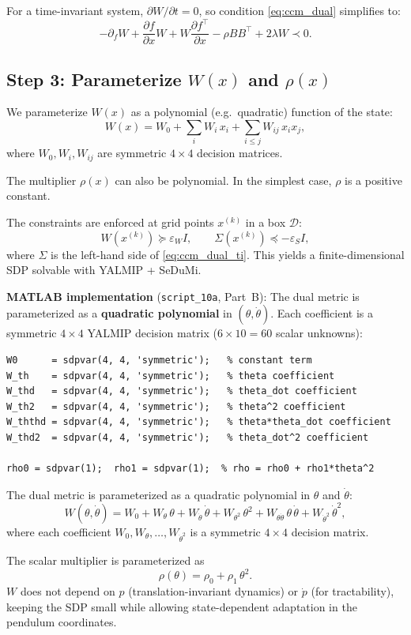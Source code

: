 \documentclass[11pt,a4paper]{article}
\begin{document}
For a time-invariant system, \(\partial W/\partial t = 0\), so condition \eqref{eq:ccm_dual} simplifies to:
\begin{equation}
-\partial_f W + \frac{\partial f}{\partial x}W + W\frac{\partial f^\top}{\partial x} - \rho B B^\top + 2\lambda W \prec 0.
\label{eq:ccm_dual_ti}
\end{equation}

\subsection{Step 3: Parameterize \(W(x)\) and \(\rho(x)\)}

We parameterize \(W(x)\) as a polynomial (e.g.\ quadratic) function of the state:
\[
W(x) = W_0 + \sum_i W_i\, x_i + \sum_{i \le j} W_{ij}\, x_i x_j,
\]
where \(W_0, W_i, W_{ij}\) are symmetric \(4\times 4\) decision matrices.

The multiplier \(\rho(x)\) can also be polynomial. In the simplest case, \(\rho\) is a positive constant.

The constraints are enforced at grid points \(x^{(k)}\) in a box \(\mathcal{D}\):
\[
W(x^{(k)}) \succeq \varepsilon_W I, \qquad
\Sigma(x^{(k)}) \preceq -\varepsilon_S I,
\]
where \(\Sigma\) is the left-hand side of \eqref{eq:ccm_dual_ti}. This yields a finite-dimensional SDP solvable with YALMIP + SeDuMi.

\noindent\textbf{MATLAB implementation} (\texttt{script\_10a}, Part~B): The dual metric is parameterized as a \textbf{quadratic polynomial} in \((\theta, \dot\theta)\).  Each coefficient is a symmetric \(4\times 4\) YALMIP decision matrix (\(6 \times 10 = 60\) scalar unknowns):

\begin{lstlisting}
W0      = sdpvar(4, 4, 'symmetric');   % constant term
W_th    = sdpvar(4, 4, 'symmetric');   % theta coefficient
W_thd   = sdpvar(4, 4, 'symmetric');   % theta_dot coefficient
W_th2   = sdpvar(4, 4, 'symmetric');   % theta^2 coefficient
W_ththd = sdpvar(4, 4, 'symmetric');   % theta*theta_dot coefficient
W_thd2  = sdpvar(4, 4, 'symmetric');   % theta_dot^2 coefficient

rho0 = sdpvar(1);  rho1 = sdpvar(1);  % rho = rho0 + rho1*theta^2
\end{lstlisting}

\begin{codemath}
The dual metric is parameterized as a quadratic polynomial in \(\theta\) and \(\dot\theta\):
\[
W(\theta,\dot\theta)
=
W_0
+ W_\theta\,\theta
+ W_{\dot\theta}\,\dot\theta
+ W_{\theta^2}\,\theta^2
+ W_{\theta\dot\theta}\,\theta\,\dot\theta
+ W_{\dot\theta^2}\,\dot\theta^2,
\]
where each coefficient \(W_0, W_\theta, \ldots, W_{\dot\theta^2}\) is a symmetric \(4\times 4\) decision matrix.

The scalar multiplier is parameterized as
\[
\rho(\theta) = \rho_0 + \rho_1\,\theta^2.
\]
\(W\) does not depend on \(p\) (translation-invariant dynamics) or \(\dot p\) (for tractability), keeping the SDP small while allowing state-dependent adaptation in the pendulum coordinates.
\end{codemath}
\end{document}

